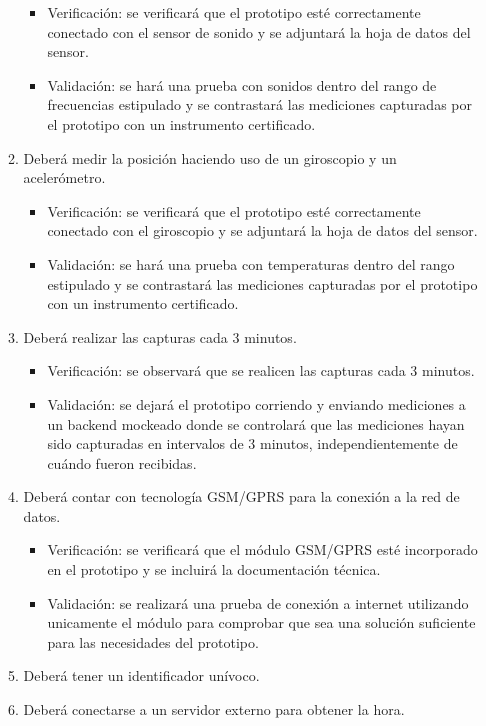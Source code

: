 \documentclass[
11pt, %
codirector, %
]{charter}
\begin{document}
\begin{enumerate}
\begin{enumerate}
				\begin{itemize}
					\item Verificación: se verificará que el prototipo esté correctamente conectado con el sensor de sonido y se adjuntará la hoja de datos del sensor.
					\item Validación: se hará una prueba con sonidos dentro del rango de frecuencias estipulado y se contrastará las mediciones capturadas por el prototipo con un instrumento certificado.
				\end{itemize}			
			\item Deberá medir la posición haciendo uso de un giroscopio y un acelerómetro.
				\begin{itemize}
					\item Verificación: se verificará que el prototipo esté correctamente conectado con el giroscopio y se adjuntará la hoja de datos del sensor.
					\item Validación: se hará una prueba con temperaturas dentro del rango estipulado y se contrastará las mediciones capturadas por el prototipo con un instrumento certificado.
				\end{itemize}		
			\item Deberá realizar las capturas cada 3 minutos.
				\begin{itemize}
					\item Verificación: se observará que se realicen las capturas cada 3 minutos.
					\item Validación: se dejará el prototipo corriendo y enviando mediciones a un backend mockeado donde se controlará que las mediciones hayan sido capturadas en intervalos de 3 minutos, independientemente de cuándo fueron recibidas.
				\end{itemize}			
			\item Deberá contar con tecnología GSM/GPRS para la conexión a la red de datos.
				\begin{itemize}
					\item Verificación: se verificará que el módulo GSM/GPRS esté incorporado en el prototipo y se incluirá la documentación técnica.
					\item Validación: se realizará una prueba de conexión a internet utilizando unicamente el módulo para comprobar que sea una solución suficiente para las necesidades del prototipo.
				\end{itemize}			
			\item Deberá tener un identificador unívoco.
			\item Deberá conectarse a un servidor externo para obtener la hora.

\end{enumerate}
\end{enumerate}
\end{document}
